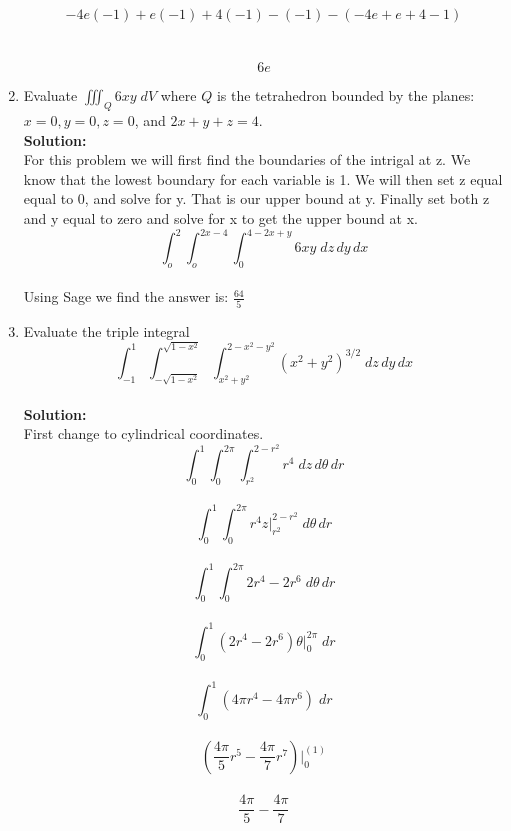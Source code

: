 \documentclass[11pt]{article}
\begin{document}
\begin{enumerate}
     $$ -4e (-1) + e (-1) + 4 (-1)  - (-1) - (-4e  + e  + 4   - 1) $$ \\
     \\
     $$ 6e $$
    
    
    
    
    
    
    
    \item Evaluate $\iiint_Q 6xy \; dV$ where $Q$ is the tetrahedron bounded by the planes: $x=0, y=0, z=0$, and $2x+y+z=4$.
    \\
    \textbf{Solution:}
    \\
    For this problem we will first find the boundaries of the intrigal at z. We know that the lowest boundary for each variable is 1. We will then set z equal equal to 0, and solve for y. That is our upper bound at y. Finally set both z and y equal to zero and solve for x to get the upper bound at x.
    \\
    $$\int_o^{2} \int_o^{2x-4} \int_0^{4-2x+y} 6xy \; dz \, dy \, dx$$
    \\
    Using Sage we find the answer is: $\frac{64}{5}$
    
    \item Evaluate the triple integral $$\int_{-1}^1 \int_{-\sqrt{1-x^2}}^{\sqrt{1-x^2}} \int_{x^2+y^2}^{2-x^2-y^2} (x^2+y^2)^{3/2} \; dz \, dy \, dx$$
    \\
    \textbf{Solution:}
    \\
    First change to cylindrical coordinates.
    \\
    $$\int_{0}^1 \int_{0}^{2 \pi} \int_{r^2}^{2-r^2} r^4 \; dz \, d \theta \, dr$$
    \\
    $$\int_{0}^1 \int_{0}^{2 \pi} r^4z |_{r^2}^{2-r^2} \;  d \theta \, dr$$
    \\
    $$\int_{0}^1 \int_{0}^{2 \pi} 2r^4-2r^6 \;  d \theta \, dr$$
    \\
    $$\int_{0}^1  (2r^4-2r^6) \theta |_{0}^{2 \pi} \;   dr$$
    \\
    $$\int_{0}^1  (4 \pi r^4-4 \pi r^6) \;   dr$$
    \\
    $$(\frac{4 \pi}{5} r^5-\frac{4 \pi}{7} r^7)|_{0}^(1) $$
    \\
    $$\frac{4 \pi}{5}-\frac{4 \pi}{7}$$
    

\end{enumerate}
\end{document}

